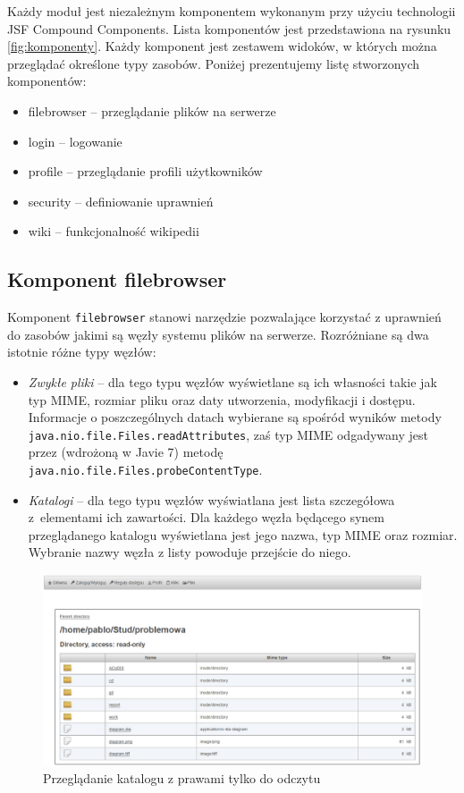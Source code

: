 \documentclass{classrep}
\begin{document}
Każdy moduł jest niezależnym komponentem wykonanym przy użyciu technologii JSF Compound Components.
Lista komponentów jest przedstawiona na rysunku \ref{fig:komponenty}.
Każdy komponent jest zestawem widoków, w których można przeglądać określone typy zasobów.
Poniżej prezentujemy listę stworzonych komponentów:
\begin{itemize}
  \item filebrowser -- przeglądanie plików na serwerze
  \item login -- logowanie
  \item profile -- przeglądanie profili użytkowników
  \item security -- definiowanie uprawnień
  \item wiki -- funkcjonalność wikipedii
\end{itemize}

\subsection{Komponent filebrowser}
Komponent \texttt{filebrowser} stanowi narzędzie pozwalające korzystać z uprawnień
do zasobów jakimi są węzły systemu plików na serwerze. Rozróżniane są dwa istotnie
różne typy węzłów:

\begin{itemize}
\item \emph{Zwykłe pliki} -- dla tego typu węzłów wyświetlane są ich własności
takie jak typ MIME, rozmiar pliku oraz daty utworzenia, modyfikacji i dostępu.
Informacje o poszczególnych datach wybierane są spośród wyników
metody \texttt{java.nio.file.Files.readAttributes}, zaś typ MIME
odgadywany jest przez (wdrożoną w Javie 7) metodę \texttt{java.nio.file.Files.probeContentType}.

\item \emph{Katalogi} -- dla tego typu węzłów wyświatlana jest lista szczegółowa
z~elementami ich zawartości. Dla każdego węzła będącego synem przeglądanego katalogu
wyświetlana jest jego nazwa, typ MIME oraz rozmiar. Wybranie nazwy węzła z listy
powoduje przejście do niego.
\end{itemize}

\begin{figure}[H]
  \caption{Przeglądanie katalogu z prawami tylko do odczytu}
  \centering
    \includegraphics[width=\textwidth]{pictures/filebrowser/dir-ro.png}
\end{figure}
\end{document}
